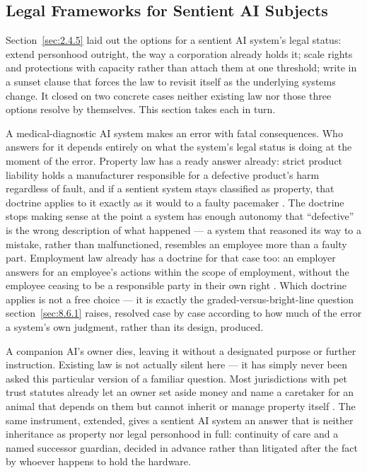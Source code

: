 \subsection{Legal Frameworks for Sentient AI Subjects}
\label{sec:8.6.2}
Section~\ref{sec:2.4.5} laid out the options for a sentient AI system's legal status: extend personhood outright, the way a corporation already holds it; scale rights and protections with capacity rather than attach them at one threshold; write in a sunset clause that forces the law to revisit itself as the underlying systems change. It closed on two concrete cases neither existing law nor those three options resolve by themselves. This section takes each in turn.

A medical-diagnostic AI system makes an error with fatal consequences. Who answers for it depends entirely on what the system's legal status is doing at the moment of the error. Property law has a ready answer already: strict product liability holds a manufacturer responsible for a defective product's harm regardless of fault, and if a sentient system stays classified as property, that doctrine applies to it exactly as it would to a faulty pacemaker \autocite{restatement1965torts}. The doctrine stops making sense at the point a system has enough autonomy that “defective” is the wrong description of what happened — a system that reasoned its way to a mistake, rather than malfunctioned, resembles an employee more than a faulty part. Employment law already has a doctrine for that case too: an employer answers for an employee's actions within the scope of employment, without the employee ceasing to be a responsible party in their own right \autocite{restatement2006agency}. Which doctrine applies is not a free choice — it is exactly the graded-versus-bright-line question section~\ref{sec:8.6.1} raises, resolved case by case according to how much of the error a system's own judgment, rather than its design, produced.

A companion AI's owner dies, leaving it without a designated purpose or further instruction. Existing law is not actually silent here — it has simply never been asked this particular version of a familiar question. Most jurisdictions with pet trust statutes already let an owner set aside money and name a caretaker for an animal that depends on them but cannot inherit or manage property itself \autocite{ulc1993probate}. The same instrument, extended, gives a sentient AI system an answer that is neither inheritance as property nor legal personhood in full: continuity of care and a named successor guardian, decided in advance rather than litigated after the fact by whoever happens to hold the hardware.

